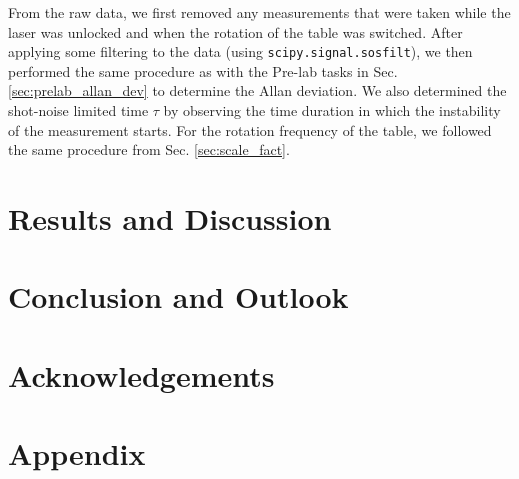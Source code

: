 \documentclass[a4paper]{report}
\numberwithin{equation}{section}
\begin{document}
From the raw data, we first removed any measurements that were taken while the laser was unlocked and when the 
rotation of the table was switched. After applying some filtering to the data (using \texttt{scipy.signal.sosfilt}), we then performed
the same procedure as with the Pre-lab tasks in Sec. \ref{sec:prelab_allan_dev} to determine the Allan deviation.
We also determined the shot-noise limited time $\tau$ by observing the time duration in which the instability of the 
measurement starts. For the rotation frequency of the table, we followed the same procedure from Sec. \ref{sec:scale_fact}. \par 



\chapter{Results and Discussion}

\chapter{Conclusion and Outlook}

\chapter{Acknowledgements}

\printbibliography

\chapter{Appendix}

\printbibliography
\end{document}
